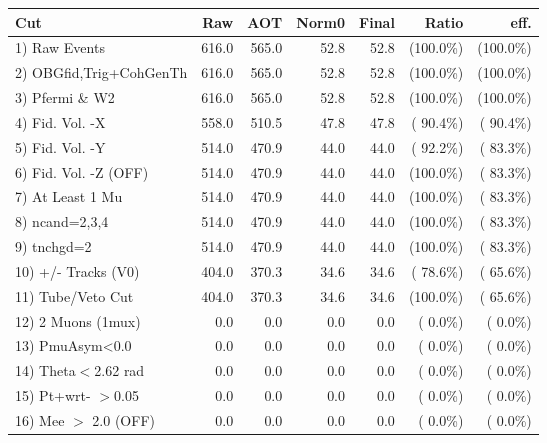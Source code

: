 \begin{table}[h!]\centering
 \begin{tabular}{||l||r|r|r|r|r|r||}
 \hline
 \hline
 Cut & Raw & AOT & Norm0 & Final & Ratio & eff.       \\
 \hline
  1) Raw Events           &        616.0 &        565.0 &         52.8 &         52.8 & (100.0\%) & (100.0\%) \\
  2) OBGfid,Trig+CohGenTh &        616.0 &        565.0 &         52.8 &         52.8 & (100.0\%) & (100.0\%) \\
  3) Pfermi \& W2         &        616.0 &        565.0 &         52.8 &         52.8 & (100.0\%) & (100.0\%) \\
  4) Fid. Vol. -X         &        558.0 &        510.5 &         47.8 &         47.8 & ( 90.4\%) & ( 90.4\%) \\
  5) Fid. Vol. -Y         &        514.0 &        470.9 &         44.0 &         44.0 & ( 92.2\%) & ( 83.3\%) \\
  6) Fid. Vol. -Z (OFF)   &        514.0 &        470.9 &         44.0 &         44.0 & (100.0\%) & ( 83.3\%) \\
  7) At Least 1 Mu        &        514.0 &        470.9 &         44.0 &         44.0 & (100.0\%) & ( 83.3\%) \\
  8) ncand=2,3,4          &        514.0 &        470.9 &         44.0 &         44.0 & (100.0\%) & ( 83.3\%) \\
  9) tnchgd=2             &        514.0 &        470.9 &         44.0 &         44.0 & (100.0\%) & ( 83.3\%) \\
 10) +/- Tracks (V0)      &        404.0 &        370.3 &         34.6 &         34.6 & ( 78.6\%) & ( 65.6\%) \\
 11) Tube/Veto Cut        &        404.0 &        370.3 &         34.6 &         34.6 & (100.0\%) & ( 65.6\%) \\
 12) 2 Muons (1mux)       &          0.0 &          0.0 &          0.0 &          0.0 & (  0.0\%) & (  0.0\%) \\
 13) PmuAsym<0.0          &          0.0 &          0.0 &          0.0 &          0.0 & (  0.0\%) & (  0.0\%) \\
 14) Theta$<$2.62 rad     &          0.0 &          0.0 &          0.0 &          0.0 & (  0.0\%) & (  0.0\%) \\
 15) Pt+wrt- $>$0.05      &          0.0 &          0.0 &          0.0 &          0.0 & (  0.0\%) & (  0.0\%) \\
 16) Mee $>$ 2.0  (OFF)   &          0.0 &          0.0 &          0.0 &          0.0 & (  0.0\%) & (  0.0\%) \\

\end{tabular}
\end{table}

